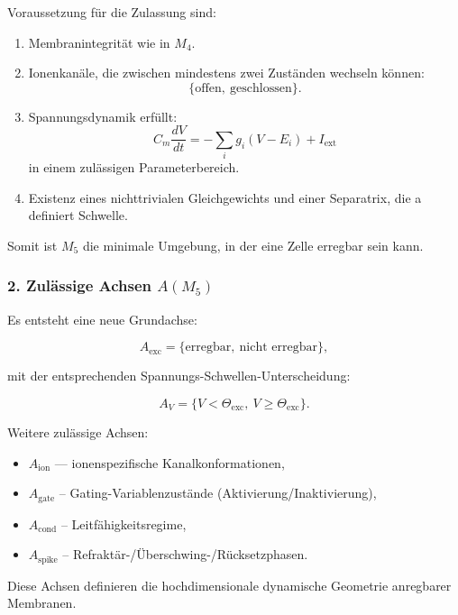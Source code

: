 Voraussetzung für die Zulassung sind:

\begin{enumerate}
    \item Membranintegrität wie in $M_4$.
    \item Ionenkanäle, die zwischen mindestens zwei Zuständen wechseln können:
          \[
          \{ \text{offen},\ \text{geschlossen} \}.
          \]
    \item Spannungsdynamik erfüllt:
          \[
          C_m \frac{dV}{dt} = - \sum_i g_i (V - E_i) + I_{\mathrm{ext}}
          \]
          in einem zulässigen Parameterbereich.
    \item Existenz eines nichttrivialen Gleichgewichts und einer Separatrix, die a definiert
          Schwelle.
\end{enumerate}

Somit ist $M_5$ die minimale Umgebung, in der eine Zelle erregbar sein kann.

\subsubsection*{2. Zulässige Achsen \texorpdfstring{$A(M_5)$}{A(M_5)}}

Es entsteht eine neue Grundachse:

\[
A_{\mathrm{exc}} = \{ \text{erregbar},\ \text{nicht erregbar} \},
\]

mit der entsprechenden Spannungs-Schwellen-Unterscheidung:

\[
A_V = \{ V < \Theta_{\mathrm{exc}},\ V \ge \Theta_{\mathrm{exc}} \}.
\]

Weitere zulässige Achsen:

\begin{itemize}
    \item $A_{\mathrm{ion}}$ — ionenspezifische Kanalkonformationen,
    \item $A_{\mathrm{gate}}$ – Gating-Variablenzustände (Aktivierung/Inaktivierung),
    \item $A_{\mathrm{cond}}$ – Leitfähigkeitsregime,
    \item $A_{\mathrm{spike}}$ – Refraktär-/Überschwing-/Rücksetzphasen.
\end{itemize}

Diese Achsen definieren die hochdimensionale dynamische Geometrie anregbarer Membranen.

